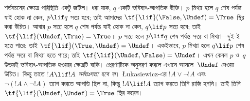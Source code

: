 \documentclass[../../../include/open-logic-section]{subfiles}
\begin{document}
শর্তবচনের ক্ষেত্রে পরিস্থিতি একটু জটিল। ধরা যাক, $q$ একটি
ভবিষ্যৎ-আপতিক উক্তি। $p$ মিথ্যা হলে $q$ শেষ পর্যন্ত যাই হোক না কেন,
$p \lif q$ সত্য হবে; তাই আমাদের $\tf{\lif}(\False, \Undef) = \True$
স্থির করা উচিত। আবার $p$ সত্য হলে $q$ শেষ পর্যন্ত যাই হোক না কেন,
$q \lif p$ সত্য হবে; তাই $\tf{\lif}(\Undef, \True) = \True$। $p$ সত্য
হলে $p \lif q$ শেষ পর্যন্ত সত্য বা মিথ্যা—দুই-ই হতে পারে; তাই
$\tf{\lif}(\True, \Undef) = \Undef$। একইভাবে, $p$ মিথ্যা হলে
$q \lif p$ শেষ পর্যন্ত সত্য বা মিথ্যা হতে পারে; তাই
$\tf{\lif}(\Undef, \False) = \Undef$। এখন কেবল $p$ ও~$q$ উভয়ই
ভবিষ্যৎ-আপতিক হওয়ার ক্ষেত্রটি বাকি। প্রেরণাটিকে অনুসরণ করলে এখানে
আসলে~$\Undef$ দেওয়া উচিত। কিন্তু তাতে $!A \lif !A$
\emph{সর্বতঃসত্য হবে না}। \L ukasiewicz-এর $!A \lor \lnot !A$ এবং
$\lnot(!A \land \lnot !A)$ ত্যাগ করতে আপত্তি ছিল না, কিন্তু
$!A \lif !A$ ত্যাগ করতে তিনি রাজি হননি। তাই তিনি
$\tf{\lif}(\Undef, \Undef) = \True$ স্থির করেন।
\end{document}
